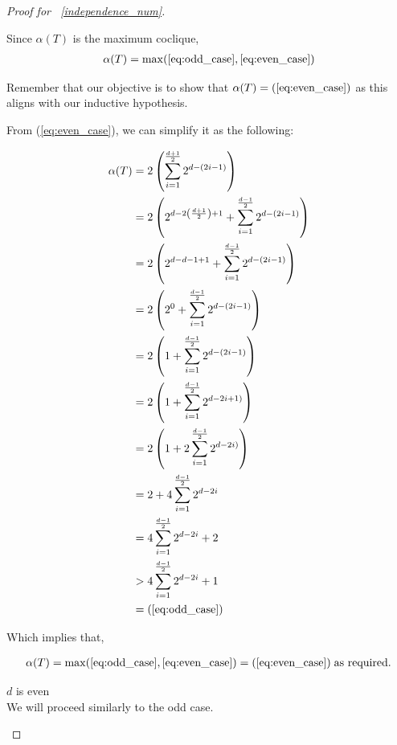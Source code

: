 \documentclass{amsart}
\theoremstyle{definition}
\begin{document}
\begin{proof}[Proof for ~\ref{independence_num}]
\begin{caseof}
\begin{subcaseof}
		\end{subcaseof}

		Since $\alpha(T)$ is the maximum coclique,
		\begin{align*}
			\alpha(T) = \max(\ref{eq:odd_case}, \ref{eq:even_case})
		\end{align*}

		Remember that our objective is to show that $\alpha(T) = (\ref{eq:even_case})$ as this aligns with our inductive hypothesis.

		From (\ref{eq:even_case}), we can simplify it as the following:

		\begin{align*}
			\alpha(T) & = 2\left(\displaystyle\sum_{i = 1}^{\frac{d + 1}{2}}2^{d - (2i - 1)}\right)  \\
				  & = 2\left(2^{d - 2\left(\frac{d + 1}{2}\right) + 1} + \displaystyle\sum_{i = 1}^{\frac{d - 1}{2}}2^{d - (2i - 1)}\right)\\
				  & = 2\left(2^{d - d - 1 + 1} + \displaystyle\sum_{i = 1}^{\frac{d - 1}{2}}2^{d - (2i - 1)}\right)\\
				  & = 2\left(2^0 + \displaystyle\sum_{i = 1}^{\frac{d - 1}{2}}2^{d - (2i - 1)}\right)\\
				  & = 2\left(1 + \displaystyle\sum_{i = 1}^{\frac{d - 1}{2}}2^{d - (2i - 1)}\right)\\
				  & = 2\left(1 + \displaystyle\sum_{i = 1}^{\frac{d - 1}{2}}2^{d - 2i + 1)}\right)\\
				  & = 2\left(1 + 2\displaystyle\sum_{i = 1}^{\frac{d - 1}{2}}2^{d - 2i)}\right)\\
				  & = 2 + 4\displaystyle\sum_{i = 1}^{\frac{d - 1}{2}}2^{d - 2i}\\
				  & = 4\displaystyle\sum_{i = 1}^{\frac{d - 1}{2}}2^{d - 2i} + 2 \\
				  & > 4\displaystyle\sum_{i = 1}^{\frac{d - 1}{2}}2^{d - 2i} + 1 \\
				  & = (\ref{eq:odd_case})
		\end{align*}

		Which implies that,

		\begin{align*}
			\alpha(T) = \max(\ref{eq:odd_case}, \ref{eq:even_case}) = (\ref{eq:even_case})\; \text{as required.}
		\end{align*}

	\item $d$ is even \\

		We will proceed similarly to the odd case.


\end{caseof}
\end{proof}
\end{document}

